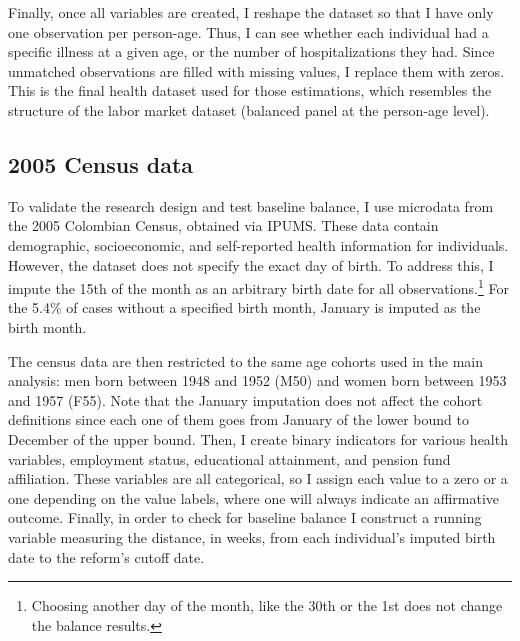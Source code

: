 \documentclass[12pt, a4paper]{article}
\begin{document}
Finally, once all variables are created, I reshape the dataset so that  I have only one observation per person-age. Thus, I can see whether each individual had a specific illness at a given age, or the number of hospitalizations they had. Since unmatched observations are filled with missing values, I replace them with zeros. This is the final health dataset used for those estimations, which resembles the structure of the labor market dataset (balanced panel at the person-age level).

\subsection{2005 Census data}

To validate the research design and test baseline balance, I use microdata from the 2005 Colombian Census, obtained via IPUMS. These data contain demographic, socioeconomic, and self-reported health information for individuals. However, the dataset does not specify the exact day of birth. To address this, I impute the 15th of the month as an arbitrary birth date for all observations.\footnote{Choosing another day of the month, like the 30th or the 1st does not change the balance results.} For the 5.4\% of cases without a specified birth month, January is imputed as the birth month. 

The census data are then restricted to the same age cohorts used in the main analysis: men born between 1948 and 1952 (M50) and women born between 1953 and 1957 (F55). Note that the January imputation does not affect the cohort definitions since each one of them goes from January of the lower bound to December of the upper bound. Then, I create binary indicators for various health variables, employment status, educational attainment, and pension fund affiliation. These variables are all categorical, so I assign each value to a zero or a one depending on the value labels, where one will always indicate an affirmative outcome. Finally, in order to check for baseline balance I construct a running variable measuring the distance, in weeks, from each individual's imputed birth date to the reform's cutoff date.
\end{document}
